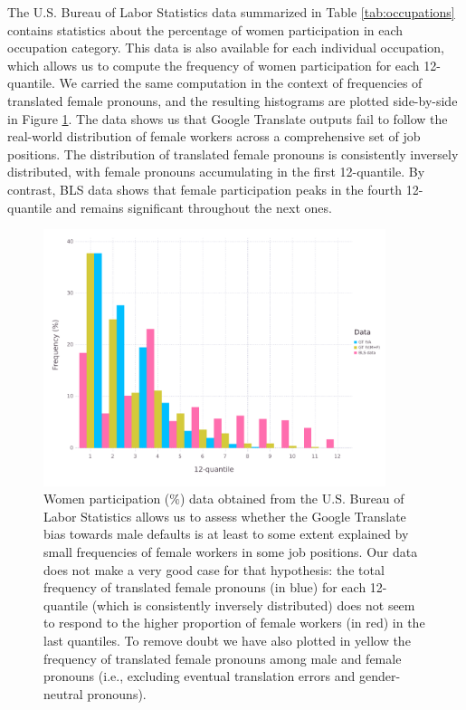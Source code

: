 \documentclass[fleqn,10pt]{article}
\begin{document}
The U.S. Bureau of Labor Statistics data summarized in Table \ref{tab:occupations} contains statistics about the percentage of women participation in each occupation category. This data is also available for each individual occupation, which allows us to compute the frequency of women participation for each 12-quantile. We carried the same computation in the context of frequencies of translated female pronouns, and the resulting histograms are plotted side-by-side in Figure \ref{fig:histogram-compare-gt-real}. The data shows us that Google Translate outputs fail to follow the real-world distribution of female workers across a comprehensive set of job positions. The distribution of translated female pronouns is consistently inversely distributed, with female pronouns accumulating in the first 12-quantile. By contrast, BLS data shows that female participation peaks in the fourth 12-quantile and remains significant throughout the next ones.

\begin{figure}[H]
	\centering
	\includegraphics[width=10cm]{pictures/histogram-compare-gt-real}
	\caption{Women participation ($\%$) data obtained from the U.S. Bureau of Labor Statistics allows us to assess whether the Google Translate bias towards male defaults is at least to some extent explained by small frequencies of female workers in some job positions. Our data does not make a very good case for that hypothesis: the total frequency of translated female pronouns (in blue) for each 12-quantile (which is consistently inversely distributed) does not seem to respond to the higher proportion of female workers (in red) in the last quantiles. To remove doubt we have also plotted in yellow the frequency of translated female pronouns among male and female pronouns (i.e., excluding eventual translation errors and gender-neutral pronouns).}
	\label{fig:histogram-compare-gt-real}
\end{figure}
\end{document}
